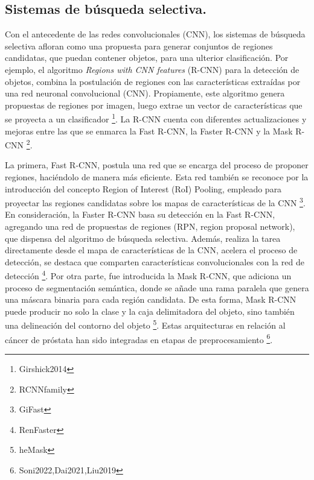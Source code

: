 



\subsection{Sistemas de búsqueda selectiva. }Con el antecedente de las redes convolucionales (CNN), los sistemas de búsqueda selectiva afloran como una propuesta para generar conjuntos de regiones candidatas, que puedan contener objetos, para una ulterior clasificación. Por ejemplo, el algoritmo \textit{Regions with CNN features} (R-CNN) para la detección de objetos, combina la postulación de regiones con las características extraídas por una red neuronal convolucional (CNN).
Propiamente, este algoritmo genera propuestas de regiones por imagen, luego extrae un vector de características que se proyecta a un clasificador \footnote{Girshick2014}. La R-CNN cuenta con diferentes actualizaciones y mejoras entre las que se enmarca la Fast R-CNN, la Faster R-CNN y la Mask R-CNN \footnote{RCNNfamily}. \par La primera, Fast R-CNN, postula una red que se encarga del proceso de proponer regiones, haciéndolo de manera más eficiente. Esta red también se reconoce por la introducción del concepto Region of Interest (RoI) Pooling, empleado para proyectar las regiones candidatas sobre los mapas de características de la CNN \footnote{GiFast}. En consideración, la Faster R-CNN basa su detección en la Fast R-CNN, agregando una red de propuestas de regiones (RPN, region proposal network), que dispensa del algoritmo de búsqueda selectiva. Además, realiza la tarea directamente desde el mapa de características de la CNN, acelera el proceso de detección, se destaca que comparten características convolucionales con la red de detección \footnote{RenFaster}. Por otra parte, fue introducida la Mask R-CNN, que adiciona un proceso de segmentación semántica, donde se añade una rama paralela que genera una máscara binaria para cada región candidata. De esta forma, Mask R-CNN puede producir no solo la clase y la caja delimitadora del objeto, sino también una delineación del contorno del objeto  \footnote{heMask}. Estas arquitecturas en relación al cáncer de próstata han sido integradas en etapas de preprocesamiento \footnote{Soni2022,Dai2021,Liu2019}.


